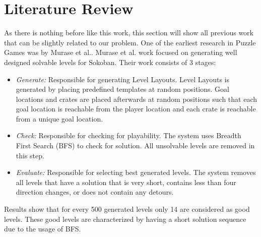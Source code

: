 \documentclass[letterpaper]{article}
\begin{document}
\section{Literature Review}
As there is nothing before like this work, this section will show all previous work that can be slightly related to our problem. One of the earliest research in Puzzle Games was by Murase et al.\cite{sokobanLevelGenerationOld}. Murase et al. work focused on generating well designed solvable levels for Sokoban\cite{sokoban}. Their work consists of 3 stages:
\begin{itemize}
	\item \emph{Generate:} Responsible for generating Level Layouts. Level Layouts is generated by placing predefined templates at random positions. Goal locations and crates are placed afterwards at random positions such that each goal location is reachable from the player location and each crate is reachable from a unique goal location.
	\item \emph{Check:} Responsible for checking for playability. The system uses Breadth First Search (BFS) to check for solution. All unsolvable levels are removed in this step.
	\item \emph{Evaluate:} Responsible for selecting best generated levels. The system removes all levels that have a solution that is very short, contains less than four direction changes, or does not contain any detours.
\end{itemize}
Results show that for every 500 generated levels only 14 are considered as good levels. These good levels are characterized by having a short solution sequence due to the usage of BFS.\\\par
\end{document}
